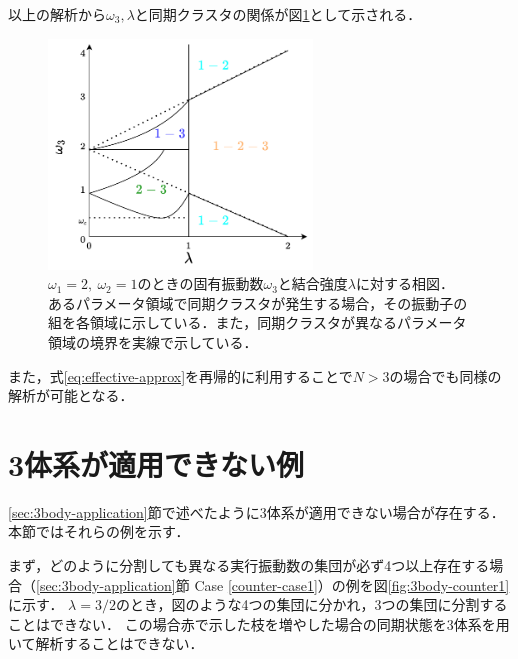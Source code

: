 \documentclass[../main]{subfiles}
\begin{document}
以上の解析から$\omega_3,\lambda$と同期クラスタの関係が図\ref{fig:appendix-bifurcation}として示される．

\begin{figure}[t]
\centering
\includegraphics[width=70mm]{./images/appendix-bifurcation.pdf}
\centering
\caption{$\omega_1=2,\ \omega_2=1$のときの固有振動数$\omega_3$と結合強度$\lambda$に対する相図．
あるパラメータ領域で同期クラスタが発生する場合，その振動子の組を各領域に示している．また，同期クラスタが異なるパラメータ領域の境界を実線で示している．}
\label{fig:appendix-bifurcation}
\end{figure}

また，式\eqref{eq:effective-approx}を再帰的に利用することで$N>3$の場合でも同様の解析が可能となる．

\chapter{3体系が適用できない例}
\label{chap:appendix-counter}
\ref{sec:3body-application}節で述べたように3体系が適用できない場合が存在する．
本節ではそれらの例を示す．

まず，どのように分割しても異なる実行振動数の集団が必ず4つ以上存在する場合（\ref{sec:3body-application}節 Case \ref{counter-case1}）の例を図\ref{fig:3body-counter1}に示す．
$\lambda=3/2$のとき，図のような4つの集団に分かれ，3つの集団に分割することはできない．
この場合赤で示した枝を増やした場合の同期状態を3体系を用いて解析することはできない．
\end{document}
